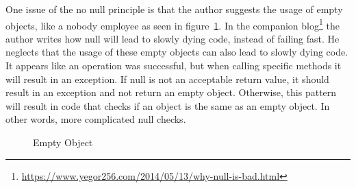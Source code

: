 
One issue of the no null principle is that the author suggests the usage of empty objects, like a nobody employee as seen in figure\ \ref{fig:empty-object}.
In the companion blog\footnote{\url{https://www.yegor256.com/2014/05/13/why-null-is-bad.html}} the author writes how null will lead to slowly dying code, instead of failing fast.
He neglects that the usage of these empty objects can also lead to slowly dying code.
It appears like an operation was successful, but when calling specific methods it will result in an exception.
If null is not an acceptable return value, it should result in an exception and not return an empty object.
Otherwise, this pattern will result in code that checks if an object is the same as an empty object.
In other words, more complicated null checks.

\begin{figure}[h]
    \caption{Empty Object}
    \label{fig:empty-object}
\end{figure}